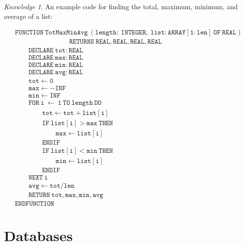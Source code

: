 \documentclass[8pt]{article}
\theoremstyle{remark}
\newtheorem{knowledge}{Knowledge}[subsection]
\begin{document}
            \begin{knowledge}
                An example code for finding the total, maximum, minimum, and average of a list:

                \begin{align*}
                    &\mathtt{FUNCTION\ TotMaxMinAvg\ (length:\ INTEGER,\ list:ARRAY [1:len]\ OF\ REAL)}\\
                    &\qquad \qquad \qquad \qquad \mathtt{RETURNS\ REAL, REAL, REAL, REAL}\\
                    &\qquad \mathtt{DECLARE\ tot:REAL}\\
                    &\qquad \mathtt{DECLARE\ max:REAL}\\
                    &\qquad \mathtt{DECLARE\ min:REAL}\\
                    &\qquad \mathtt{DECLARE\ avg:REAL}\\
                    &\qquad \mathtt{tot \leftarrow 0}\\
                    &\qquad \mathtt{max \leftarrow -INF}\\
                    &\qquad \mathtt{min \leftarrow INF}\\
                    &\qquad \mathtt{FOR\ i\ \leftarrow\ 1\ TO\ length\ DO}\\
                    &\qquad \qquad \mathtt{tot \leftarrow tot + list[i]}\\
                    &\qquad \qquad \mathtt{IF\ list[i] > max\ THEN}\\
                    &\qquad \qquad \qquad \mathtt{max \leftarrow list[i]}\\
                    &\qquad \qquad \mathtt{ENDIF}\\
                    &\qquad \qquad \mathtt{IF\ list[i] < min\ THEN}\\
                    &\qquad \qquad \qquad \mathtt{min \leftarrow list[i]}\\
                    &\qquad \qquad \mathtt{ENDIF}\\
                    &\qquad \mathtt{NEXT\ i}\\
                    &\qquad \mathtt{avg \leftarrow tot / len}\\
                    &\qquad \mathtt{RETURN\ tot, max, min, avg}\\
                    &\mathtt{ENDFUNCTION}
                \end{align*}
            \end{knowledge}
    \section{Databases}
\end{document}
